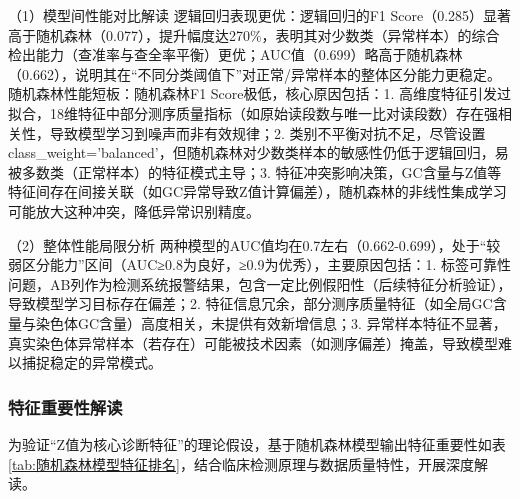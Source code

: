 \documentclass[withoutpreface,bwprint]{cumcmthesis} %
\begin{document}
（1）模型间性能对比解读
逻辑回归表现更优：逻辑回归的F1 Score（0.285）显著高于随机森林（0.077），提升幅度达270\%，表明其对少数类（异常样本）的综合检出能力（查准率与查全率平衡）更优；AUC值（0.699）略高于随机森林（0.662），说明其在“不同分类阈值下”对正常/异常样本的整体区分能力更稳定。  
随机森林性能短板：随机森林F1 Score极低，核心原因包括：1. 高维度特征引发过拟合，18维特征中部分测序质量指标（如原始读段数与唯一比对读段数）存在强相关性，导致模型学习到噪声而非有效规律；2. 类别不平衡对抗不足，尽管设置class\_weight='balanced'，但随机森林对少数类样本的敏感性仍低于逻辑回归，易被多数类（正常样本）的特征模式主导；3. 特征冲突影响决策，GC含量与Z值等特征间存在间接关联（如GC异常导致Z值计算偏差），随机森林的非线性集成学习可能放大这种冲突，降低异常识别精度。

（2）整体性能局限分析
两种模型的AUC值均在0.7左右（0.662-0.699），处于“较弱区分能力”区间（AUC≥0.8为良好，≥0.9为优秀），主要原因包括：1. 标签可靠性问题，AB列作为检测系统报警结果，包含一定比例假阳性（后续特征分析验证），导致模型学习目标存在偏差；2. 特征信息冗余，部分测序质量特征（如全局GC含量与染色体GC含量）高度相关，未提供有效新增信息；3. 异常样本特征不显著，真实染色体异常样本（若存在）可能被技术因素（如测序偏差）掩盖，导致模型难以捕捉稳定的异常模式。


\subsubsection{特征重要性解读}
为验证“Z值为核心诊断特征”的理论假设，基于随机森林模型输出特征重要性如表\ref{tab:随机森林模型特征排名}，结合临床检测原理与数据质量特性，开展深度解读。
\end{document}
